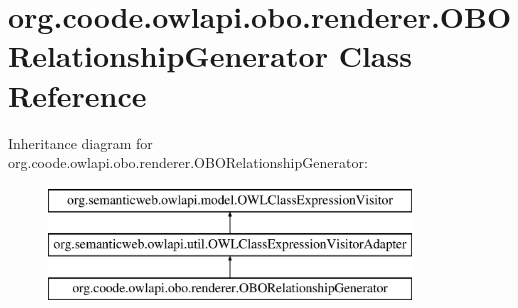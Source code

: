 \hypertarget{classorg_1_1coode_1_1owlapi_1_1obo_1_1renderer_1_1_o_b_o_relationship_generator}{\section{org.\-coode.\-owlapi.\-obo.\-renderer.\-O\-B\-O\-Relationship\-Generator Class Reference}
\label{classorg_1_1coode_1_1owlapi_1_1obo_1_1renderer_1_1_o_b_o_relationship_generator}
}
Inheritance diagram for org.\-coode.\-owlapi.\-obo.\-renderer.\-O\-B\-O\-Relationship\-Generator\-:\begin{figure}[H]
\begin{center}
\leavevmode
\includegraphics[height=3.000000cm]{classorg_1_1coode_1_1owlapi_1_1obo_1_1renderer_1_1_o_b_o_relationship_generator}
\end{center}
\end{figure}
